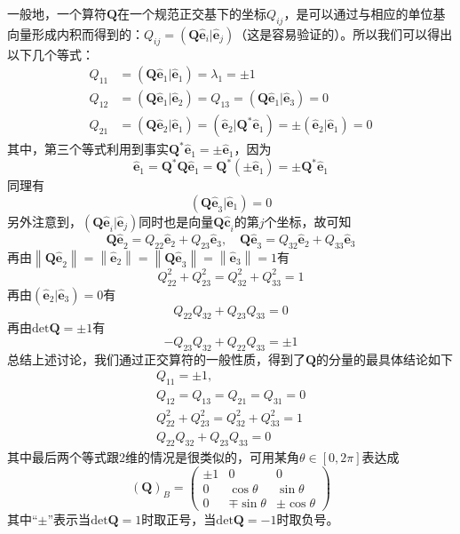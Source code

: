 \documentclass[../main.tex]{subfiles}
\begin{document}
一般地，一个算符$\mathbf{Q}$在一个规范正交基下的坐标$Q_{ij}$，是可以通过与相应的单位基向量形成内积而得到的：$Q_{ij}=\left(\mathbf{Q}\mathbf{\hat{e}}_i|\mathbf{\hat{e}}_j\right)$（这是容易验证的）。所以我们可以得出以下几个等式：
\[\begin{aligned}
        Q_{11} & =\left(\mathbf{Q}\mathbf{\hat{e}}_1|\mathbf{\hat{e}}_1\right)=\lambda_1=\pm 1                                                                                                        \\
        Q_{12} & =\left(\mathbf{Q}\mathbf{\hat{e}}_1|\mathbf{\hat{e}}_2\right)=Q_{13}=\left(\mathbf{Q}\mathbf{\hat{e}}_1|\mathbf{\hat{{e}}}_3\right)=0                                                \\
        Q_{21} & =\left(\mathbf{Q}\mathbf{\hat{e}}_2|\mathbf{\hat{e}}_1\right)=\left(\mathbf{\hat{e}}_2|\mathbf{Q}^*\mathbf{\hat{e}}_1\right)=\pm\left(\mathbf{\hat{e}}_2|\mathbf{\hat{e}}_1\right)=0
    \end{aligned}\]
其中，第三个等式利用到事实$\mathbf{Q}^*\mathbf{\hat{e}}_1=\pm\mathbf{\hat{e}}_1$，因为
\[\mathbf{\hat{e}}_1=\mathbf{Q}^*\mathbf{Q}\mathbf{\hat{e}}_1=\mathbf{Q}^*\left(\pm\mathbf{\hat{e}}_1\right)=\pm\mathbf{Q}^*\mathbf{\hat{e}}_1\]
同理有
\[\left(\mathbf{Q\hat{e}}_3|\mathbf{\hat{e}}_1\right)=0\]
另外注意到，$\left(\mathbf{Q\hat{e}}_i|\mathbf{\hat{e}}_j\right)$同时也是向量$\mathbf{Q\hat{c}}_i$的第$j$个坐标，故可知
\[\mathbf{Q\hat{e}}_2=Q_{22}\mathbf{\hat{e}}_2+Q_{23}\mathbf{\hat{e}}_3,\quad\mathbf{Q\hat{e}}_3=Q_{32}\mathbf{\hat{e}}_2+Q_{33}\mathbf{\hat{e}}_3\]
再由$\left\|\mathbf{Q\hat{e}}_2\right\|=\left\|\mathbf{\hat{e}}_2\right\|=\left\|\mathbf{Q\hat{e}}_3\right\|=\left\|\mathbf{\hat{e}}_3\right\|=1$有
\[Q_{22}^2+Q_{23}^2=Q_{32}^2+Q_{33}^2=1\]
再由$\left(\mathbf{\hat{e}}_2|\mathbf{\hat{e}}_3\right)=0$有
\[Q_{22}Q_{32}+Q_{23}Q_{33}=0\]
再由$\mathrm{det}\mathbf{Q}=\pm 1$有
\[-Q_{23}Q_{32}+Q_{22}Q_{33}=\pm 1\]
总结上述讨论，我们通过正交算符的一般性质，得到了$\mathbf{Q}$的分量的最具体结论如下
\[
    \begin{array}{l}
        Q_{11}                     =\pm 1,             \\
        Q_{12}=Q_{13}=Q_{21}=Q_{31}=0                  \\
        Q_{22}^2+Q_{23}^2         =Q_{32}^2+Q_{33}^2=1 \\
        Q_{22}Q_{32}+Q_{23}Q_{33} =0
    \end{array}
\]
其中最后两个等式跟2维的情况是很类似的，可用某角$\theta\in\left[0,2\pi\right]$表达成
\[\left(\mathbf{Q}\right)_B=\left(\begin{array}{ccc}\pm 1&0&0\\0&\cos\theta&\sin\theta\\0&\mp\sin\theta&\pm\cos\theta\end{array}\right)\]
其中“$\pm$”表示当$\mathrm{det}\mathbf{Q}=1$时取正号，当$\mathrm{det}\mathbf{Q}=-1$时取负号。
\end{document}
